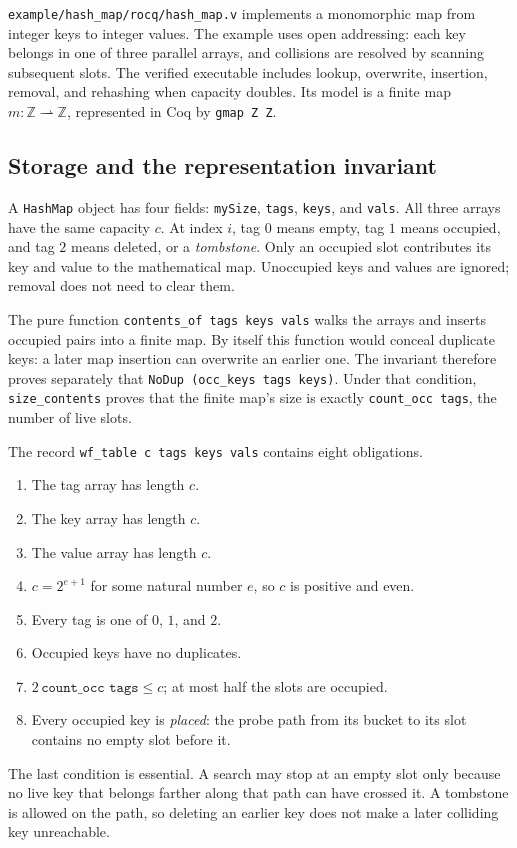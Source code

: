\documentclass[11pt]{article}
\begin{document}
\texttt{example/hash\_map/rocq/hash\_map.v} implements a monomorphic map from integer
keys to integer values. The example uses open addressing: each key belongs in
one of three parallel arrays, and collisions are resolved by scanning subsequent
slots. The verified executable includes lookup, overwrite, insertion, removal,
and rehashing when capacity doubles. Its model is a finite map
$m : \mathbb{Z} \rightharpoonup \mathbb{Z}$, represented in Coq by
\texttt{gmap Z Z}.

\subsection{Storage and the representation invariant}

A \texttt{HashMap} object has four fields: \texttt{mySize}, \texttt{tags},
\texttt{keys}, and \texttt{vals}. All three arrays have the same capacity
$c$. At index $i$, tag $0$ means empty, tag $1$ means occupied, and tag $2$
means deleted, or a \emph{tombstone}. Only an occupied slot contributes its key
and value to the mathematical map. Unoccupied keys and values are ignored;
removal does not need to clear them.

The pure function \texttt{contents\_of tags keys vals} walks the arrays and
inserts occupied pairs into a finite map. By itself this function would conceal
duplicate keys: a later map insertion can overwrite an earlier one. The
invariant therefore proves separately that
\texttt{NoDup (occ\_keys tags keys)}. Under that condition,
\texttt{size\_contents} proves that the finite map's size is exactly
\texttt{count\_occ tags}, the number of live slots.

The record \texttt{wf\_table c tags keys vals} contains eight obligations.
\begin{enumerate}
\item The tag array has length $c$.
\item The key array has length $c$.
\item The value array has length $c$.
\item $c=2^{e+1}$ for some natural number $e$, so $c$ is positive and even.
\item Every tag is one of $0$, $1$, and $2$.
\item Occupied keys have no duplicates.
\item $2\,\texttt{count\_occ tags}\leq c$; at most half the slots are occupied.
\item Every occupied key is \emph{placed}: the probe path from its bucket to
its slot contains no empty slot before it.
\end{enumerate}
The last condition is essential. A search may stop at an empty slot only
because no live key that belongs farther along that path can have crossed it.
A tombstone is allowed on the path, so deleting an earlier key does not make a
later colliding key unreachable.
\end{document}
